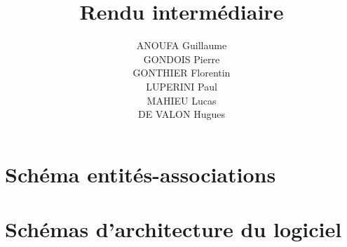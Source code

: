 \documentclass[a4paper, 10pt, french]{article}
\title{Rendu intermédiaire}
\author{
    ANOUFA Guillaume
    \\ GONDOIS Pierre
    \\ GONTHIER Florentin
    \\ LUPERINI Paul
    \\ MAHIEU Lucas
    \\ DE VALON Hugues
}
\begin{document}
\maketitle

\section{Schéma entités-associations}
{
}

\section{Schémas d'architecture du logiciel}
{
}

\end{document}
